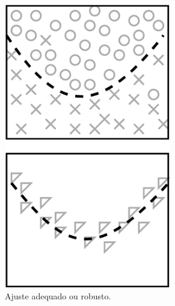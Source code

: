 \begin{figure}[!h]
\begin{subfigure}[b]{0.3\textwidth}
         \includegraphics[width=0.8\textwidth]{chapters/cap-learning/fitting-robust.eps} 
         \caption{Ajuste adequado ou robusto.}
         \label{fig:fitting:robust}
     \end{subfigure}
     \quad
     \begin{subfigure}[b]{0.3\textwidth}
         \centering

\end{subfigure}
\end{figure}

